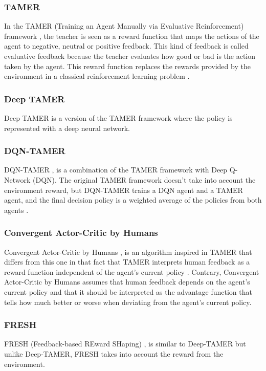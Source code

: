 \subsubsection*{TAMER}
In the TAMER (Training an Agent Manually via Evaluative Reinforcement) framework \cite{TAMER-Knox-Stone:2009}, the teacher is seen as a reward function that maps the actions of the agent to negative, neutral or positive feedback. This kind of feedback is called evaluative feedback because the teacher evaluates how good or bad is the action taken by the agent. This reward function replaces the rewards provided by the environment in a classical reinforcement learning problem \cite{leveraging-human-guidance:2019}.
 

\subsubsection*{Deep TAMER}
Deep TAMER \cite{DeepTAMER-Warnell-et-al:2018} is a version of the TAMER framework \cite{TAMER-Knox-Stone:2009} where the policy is represented with a deep neural network.

\subsubsection*{DQN-TAMER}
DQN-TAMER \cite{DQN-TAMER-Arakawa:2018}, is a combination of the TAMER framework \cite{TAMER-Knox-Stone:2009} with Deep Q-Network (DQN). The original TAMER framework doesn't take into account the environment reward, but DQN-TAMER trains a DQN agent and a TAMER agent, and the final decision policy is a weighted average of the policies from both agents \cite{leveraging-human-guidance:2019}.

\subsubsection*{Convergent Actor-Critic by Humans}
Convergent Actor-Critic by Humans \cite{fakeCOACH-MacGlashan-Ho-Loftin:2017}, is an algorithm inspired in TAMER \cite{TAMER-Knox-Stone:2009} that differs from this one in that fact that TAMER interprets human feedback as a reward function independent of the agent’s current policy \cite{leveraging-human-guidance:2019}. 
Contrary, Convergent Actor-Critic by Humans assumes that human feedback depends on the agent's current policy and that it should be interpreted as the advantage function that tells how much better or worse when deviating from the agent’s current policy.

\subsubsection*{FRESH}
FRESH (Feedback-based REward SHaping) \cite{FRESH-xiao:2020}, is similar to Deep-TAMER \cite{DeepTAMER-Warnell-et-al:2018} but unlike Deep-TAMER, FRESH takes into account the reward from the environment.



